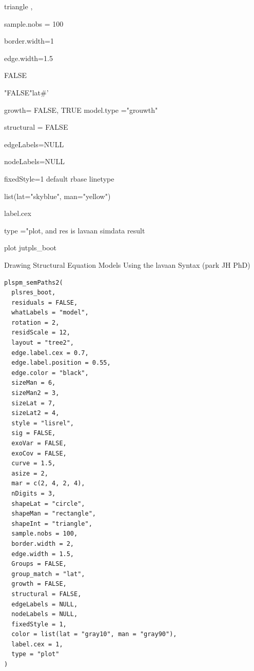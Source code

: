 \documentclass[a4paper]{book}
\begin{document}
\begin{Arguments}
\begin{ldescription}
\item[\code{shapeInt}] triangle ,

\item[\code{sample.nobs}] sample.nobs = 100

\item[\code{border.width}] border.width=1

\item[\code{edge.width}] edge.width=1.5

\item[\code{Groups}] FALSE

\item[\code{group\_match}] "FALSE"lat\#'

\item[\code{growth}] growth= FALSE, TRUE  model.type ="grouwth"

\item[\code{structural}] structural = FALSE

\item[\code{edgeLabels}] edgeLabels=NULL

\item[\code{nodeLabels}] nodeLabels=NULL

\item[\code{fixedStyle}] fixedStyle=1 default rbase linetype

\item[\code{color}] list(lat="skyblue", man="yellow")

\item[\code{label.cex}] label.cex

\item[\code{type}] type ="plot, and res is lavaan simdata result
\end{ldescription}
\end{Arguments}
%
\begin{Value}
plot jutpls\_boot
\end{Value}
%
\begin{Description}
Drawing Structural Equation Models Using the lavaan Syntax (park JH PhD)
\end{Description}
%
\begin{Usage}
\begin{verbatim}
plspm_semPaths2(
  plsres_boot,
  residuals = FALSE,
  whatLabels = "model",
  rotation = 2,
  residScale = 12,
  layout = "tree2",
  edge.label.cex = 0.7,
  edge.label.position = 0.55,
  edge.color = "black",
  sizeMan = 6,
  sizeMan2 = 3,
  sizeLat = 7,
  sizeLat2 = 4,
  style = "lisrel",
  sig = FALSE,
  exoVar = FALSE,
  exoCov = FALSE,
  curve = 1.5,
  asize = 2,
  mar = c(2, 4, 2, 4),
  nDigits = 3,
  shapeLat = "circle",
  shapeMan = "rectangle",
  shapeInt = "triangle",
  sample.nobs = 100,
  border.width = 2,
  edge.width = 1.5,
  Groups = FALSE,
  group_match = "lat",
  growth = FALSE,
  structural = FALSE,
  edgeLabels = NULL,
  nodeLabels = NULL,
  fixedStyle = 1,
  color = list(lat = "gray10", man = "gray90"),
  label.cex = 1,
  type = "plot"
)
\end{verbatim}
\end{Usage}
\end{document}
